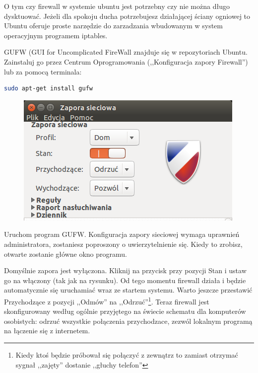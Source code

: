 O tym czy firewall w systemie ubuntu jest potrzebny czy nie można długo dysktuować. Jeżeli dla spokoju ducha potrzebujesz działającej ściany ogniowej to Ubuntu oferuje proste narzędzie do zarzadzania wbudowanym w system operacyjnym programem iptables.

GUFW (\textcolor{ubuntu_orange}{GUI for Uncomplicated FireWall} znajduje się w repozytoriach Ubuntu. Zainstaluj go przez Centrum Oprogramowania (,,Konfiguracja zapory Firewall'') lub za pomocą terminala:
\begin{lstlisting}[language=bash]
sudo apt-get install gufw
\end{lstlisting}

\begin{figure}
	\vspace{-10pt}
	\includegraphics[width=\linewidth]{images/programy_gufw.png}
\end{figure}

Uruchom program GUFW. Konfiguracja zapory sieciowej wymaga uprawnień administratora, zostaniesz poproszony o uwierzytelnienie się. Kiedy to zrobisz, otwarte zostanie główne okno programu.

Domyślnie zapora jest wyłączona. Kliknij na przycisk przy pozycji \textcolor{ubuntu_orange}{Stan} i ustaw go na włączony (tak jak na rysunku). Od tego momentu firewall działa i będzie automatycznie się uruchamiać wraz ze startem systemu. Warto jeszcze przestawić \textcolor{ubuntu_orange}{Przychodzące} z pozycji ,,Odmów'' na ,,Odrzuć''\footnote{Kiedy ktoś będzie próbował się połączyć z zewnątrz to zamiast otrzymać sygnał ,,zajęty'' dostanie ,,głuchy telefon''}. Teraz firewall jest skonfigurowany według ogólnie przyjętego na świecie schematu dla komputerów osobistych: odrzuć wszystkie połączenia przychodzace, zezwól lokalnym programą na łączenie się z internetem.


